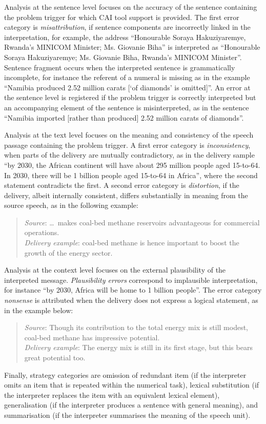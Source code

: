 Analysis at the sentence level focuses on the accuracy of the sentence containing the problem trigger for which CAI tool support is provided. The first error category is \textit{misattribution}, if sentence components are incorrectly linked in the interpretation, for example, the address ``Honourable Soraya Hakuziyaremye, Rwanda’s MINICOM Minister; Ms. Giovanie Biha'' is interpreted as ``Honourable Soraya Hakuziyaremye; Ms. Giovanie Biha, Rwanda’s MINICOM Minister''. Sentence fragment occurs when the interpreted sentence is grammatically incomplete, for instance the referent of a numeral is missing as in the example ``Namibia produced 2.52 million carats [‘of diamonds’ is omitted]''. An error at the sentence level is registered if the problem trigger is correctly interpreted but an accompanying element of the sentence is misinterpreted, as in the sentence ``Namibia imported [rather than produced] 2.52 million carats of diamonds''.

Analysis at the text level focuses on the meaning and consistency of the speech passage containing the problem trigger. A first error category is \textit{inconsistency}, when parts of the delivery are mutually contradictory, as in the delivery sample ``by 2030, the African continent will have about 295 million people aged 15-to-64. In 2030, there will be 1 billion people aged 15-to-64 in Africa'', where the second statement contradicts the first. A second error category is \textit{distortion}, if the delivery, albeit internally consistent, differs substantially in meaning from the source speech, as in the following example:

\begin{quote}
    \textit{Source}: \ldots\, makes coal-bed methane reservoirs advantageous for commercial operations.\\
\textit{Delivery example}: coal-bed methane is hence important to boost the growth of the energy sector.
\end{quote}
Analysis at the context level focuses on the external plausibility of the interpreted message. \textit{Plausibility errors} correspond to implausible interpretation, for instance ``by 2030, Africa will be home to 1 billion people''. The error category \textit{nonsense} is attributed when the delivery does not express a logical statement, as in the example below:

\begin{quote}
    \textit{Source}: Though its contribution to the total energy mix is still modest, coal-bed methane has impressive potential.\\
\textit{Delivery example}: The energy mix is still in its first stage, but this bears great potential too.
\end{quote}
Finally, strategy categories are omission of redundant item (if the interpreter omits an item that is repeated within the numerical task), lexical substitution (if the interpreter replaces the item with an equivalent lexical element), generalisation (if the interpreter produces a sentence with general meaning), and summarisation (if the interpreter summarises the meaning of the speech unit).

